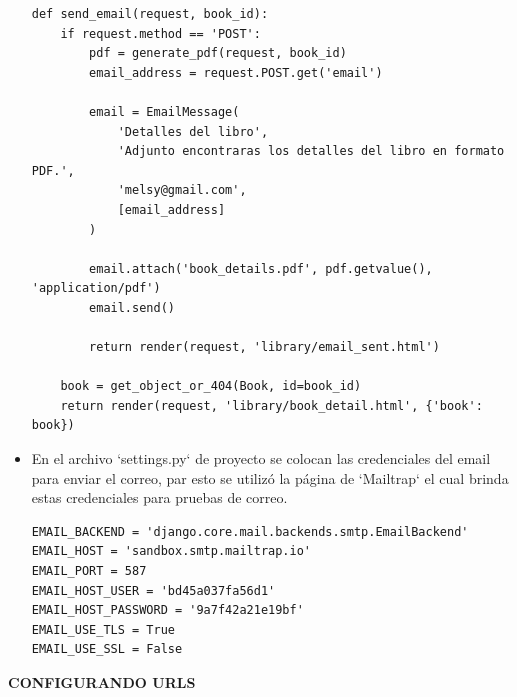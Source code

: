 \documentclass{article}
\begin{document}
\begin{itemize}
\begin{lstlisting}[style=python]
def send_email(request, book_id):
    if request.method == 'POST':
        pdf = generate_pdf(request, book_id)
        email_address = request.POST.get('email')

        email = EmailMessage(
            'Detalles del libro',
            'Adjunto encontraras los detalles del libro en formato PDF.',
            'melsy@gmail.com',
            [email_address]
        )

        email.attach('book_details.pdf', pdf.getvalue(), 'application/pdf')
        email.send()

        return render(request, 'library/email_sent.html')
    
    book = get_object_or_404(Book, id=book_id)
    return render(request, 'library/book_detail.html', {'book': book})
\end{lstlisting}

\item En el archivo `settings.py` de proyecto se colocan las credenciales del email para enviar el correo, par esto se utilizó la página de `Mailtrap` el cual brinda estas credenciales para pruebas de correo.

\begin{lstlisting}[style=python]
EMAIL_BACKEND = 'django.core.mail.backends.smtp.EmailBackend'
EMAIL_HOST = 'sandbox.smtp.mailtrap.io'
EMAIL_PORT = 587
EMAIL_HOST_USER = 'bd45a037fa56d1'
EMAIL_HOST_PASSWORD = '9a7f42a21e19bf'
EMAIL_USE_TLS = True
EMAIL_USE_SSL = False
\end{lstlisting}

\end{itemize}


\vspace{2\baselineskip}

\textbf{CONFIGURANDO URLS}

\vspace{\baselineskip}
\end{document}
